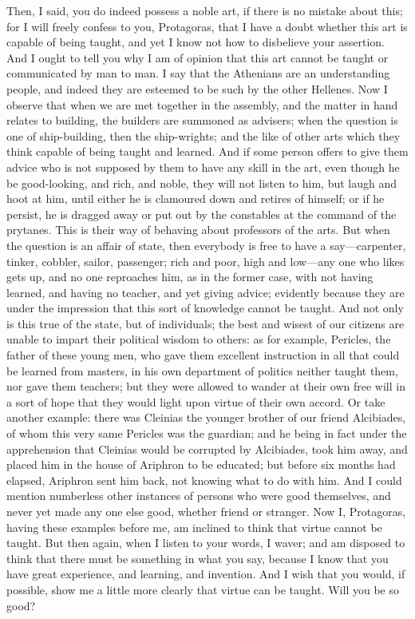\documentclass[11pt,letter]{article}
\begin{document}
\par  Then, I said, you do indeed possess a noble art, if there is no mistake about this; for I will freely confess to you, Protagoras, that I have a doubt whether this art is capable of being taught, and yet I know not how to disbelieve your assertion. And I ought to tell you why I am of opinion that this art cannot be taught or communicated by man to man. I say that the Athenians are an understanding people, and indeed they are esteemed to be such by the other Hellenes. Now I observe that when we are met together in the assembly, and the matter in hand relates to building, the builders are summoned as advisers; when the question is one of ship-building, then the ship-wrights; and the like of other arts which they think capable of being taught and learned. And if some person offers to give them advice who is not supposed by them to have any skill in the art, even though he be good-looking, and rich, and noble, they will not listen to him, but laugh and hoot at him, until either he is clamoured down and retires of himself; or if he persist, he is dragged away or put out by the constables at the command of the prytanes. This is their way of behaving about professors of the arts. But when the question is an affair of state, then everybody is free to have a say—carpenter, tinker, cobbler, sailor, passenger; rich and poor, high and low—any one who likes gets up, and no one reproaches him, as in the former case, with not having learned, and having no teacher, and yet giving advice; evidently because they are under the impression that this sort of knowledge cannot be taught. And not only is this true of the state, but of individuals; the best and wisest of our citizens are unable to impart their political wisdom to others: as for example, Pericles, the father of these young men, who gave them excellent instruction in all that could be learned from masters, in his own department of politics neither taught them, nor gave them teachers; but they were allowed to wander at their own free will in a sort of hope that they would light upon virtue of their own accord. Or take another example: there was Cleinias the younger brother of our friend Alcibiades, of whom this very same Pericles was the guardian; and he being in fact under the apprehension that Cleinias would be corrupted by Alcibiades, took him away, and placed him in the house of Ariphron to be educated; but before six months had elapsed, Ariphron sent him back, not knowing what to do with him. And I could mention numberless other instances of persons who were good themselves, and never yet made any one else good, whether friend or stranger. Now I, Protagoras, having these examples before me, am inclined to think that virtue cannot be taught. But then again, when I listen to your words, I waver; and am disposed to think that there must be something in what you say, because I know that you have great experience, and learning, and invention. And I wish that you would, if possible, show me a little more clearly that virtue can be taught. Will you be so good?
\end{document}

